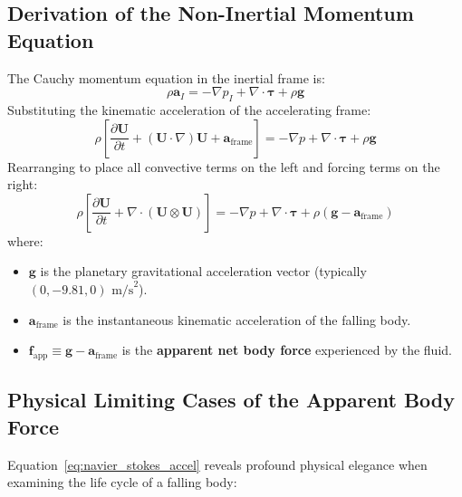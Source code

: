 \documentclass[11pt,a4paper]{article}
\newcommand{\vect}[1]{\mathbf{#1}}
\newcommand{\tensor}[1]{\bm{#1}}
\newcommand{\grad}{\nabla}
\newcommand{\pderiv}[2]{\frac{\partial #1}{\partial #2}}
\newcommand{\aframe}{\vect{a}_{\mathrm{frame}}}
\newcommand{\fapp}{\vect{f}_{\mathrm{app}}}
\begin{document}
\subsection{Derivation of the Non-Inertial Momentum Equation}
The Cauchy momentum equation in the inertial frame is:
\begin{equation}
    \rho \vect{a}_I = -\grad p_I + \grad \cdot \tensor{\tau} + \rho \vect{g}
\end{equation}
Substituting the kinematic acceleration of the accelerating frame:
\begin{equation}
    \rho \left[ \pderiv{\vect{U}}{t} + (\vect{U} \cdot \grad)\vect{U} + \aframe \right] = -\grad p + \grad \cdot \tensor{\tau} + \rho \vect{g}
\end{equation}
Rearranging to place all convective terms on the left and forcing terms on the right:
\begin{equation}
    \boxed{\rho \left[ \pderiv{\vect{U}}{t} + \grad \cdot (\vect{U} \otimes \vect{U}) \right] = -\grad p + \grad \cdot \tensor{\tau} + \rho (\vect{g} - \aframe)}
    \label{eq:navier_stokes_accel}
\end{equation}
where:
\begin{itemize}
    \item $\vect{g}$ is the planetary gravitational acceleration vector (typically $(0, -9.81, 0)\text{ m/s}^2$).
    \item $\aframe$ is the instantaneous kinematic acceleration of the falling body.
    \item $\fapp \equiv \vect{g} - \aframe$ is the \textbf{apparent net body force} experienced by the fluid.
\end{itemize}

\subsection{Physical Limiting Cases of the Apparent Body Force}
Equation~\eqref{eq:navier_stokes_accel} reveals profound physical elegance when examining the life cycle of a falling body:
\end{document}
